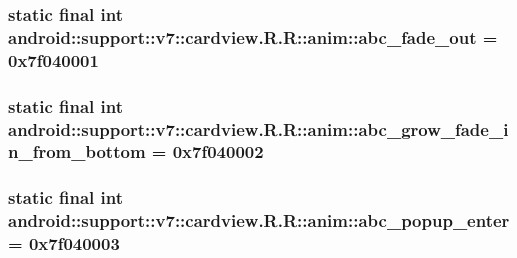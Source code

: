 \hypertarget{classandroid_1_1support_1_1v7_1_1cardview_1_1_r_1_1anim_4dfab6238ca989c97d4a5ddb589c4ddb}{
\subsubsection[{abc\_\-fade\_\-out}]{\setlength{\rightskip}{0pt plus 5cm}static final int android::support::v7::cardview.R.R::anim::abc\_\-fade\_\-out = 0x7f040001}}
\label{classandroid_1_1support_1_1v7_1_1cardview_1_1_r_1_1anim_4dfab6238ca989c97d4a5ddb589c4ddb}


\hypertarget{classandroid_1_1support_1_1v7_1_1cardview_1_1_r_1_1anim_a9e0f6d449d27d5e28dc4260aa91fddb}{
\subsubsection[{abc\_\-grow\_\-fade\_\-in\_\-from\_\-bottom}]{\setlength{\rightskip}{0pt plus 5cm}static final int android::support::v7::cardview.R.R::anim::abc\_\-grow\_\-fade\_\-in\_\-from\_\-bottom = 0x7f040002}}
\label{classandroid_1_1support_1_1v7_1_1cardview_1_1_r_1_1anim_a9e0f6d449d27d5e28dc4260aa91fddb}


\hypertarget{classandroid_1_1support_1_1v7_1_1cardview_1_1_r_1_1anim_f2e0cb18d32d99c0603a073d5a172294}{
\subsubsection[{abc\_\-popup\_\-enter}]{\setlength{\rightskip}{0pt plus 5cm}static final int android::support::v7::cardview.R.R::anim::abc\_\-popup\_\-enter = 0x7f040003}}
\label{classandroid_1_1support_1_1v7_1_1cardview_1_1_r_1_1anim_f2e0cb18d32d99c0603a073d5a172294}


